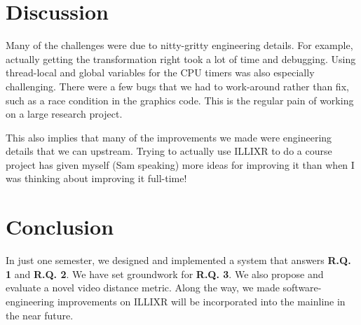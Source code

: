 \section{Discussion}

Many of the challenges were due to nitty-gritty engineering details. For example, actually getting the transformation right took a lot of time and debugging. Using thread-local and global variables for the CPU timers was also especially challenging. There were a few bugs that we had to work-around rather than fix, such as a race condition in the graphics code. This is the regular pain of working on a large research project.

This also implies that many of the improvements we made were engineering details that we can upstream. Trying to actually use ILLIXR to do a course project has given myself (Sam speaking) more ideas for improving it than when I was thinking about improving it full-time!

\section{Conclusion}

In just one semester, we designed and implemented a system that answers \textbf{R.Q. 1} and \textbf{R.Q. 2}. We have set groundwork for \textbf{R.Q. 3}. We also propose and evaluate a novel video distance metric. Along the way, we made software-engineering improvements on ILLIXR will be incorporated into the mainline in the near future.
